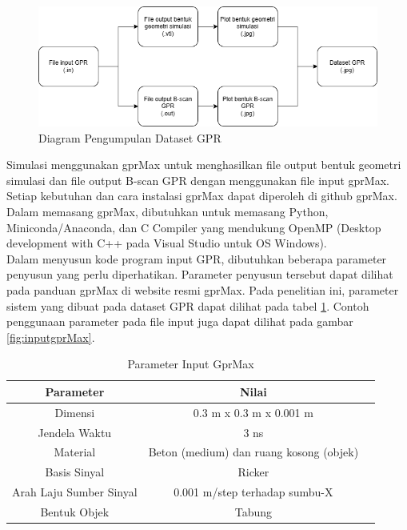 \documentclass[conference]{IEEEtran}
\begin{document}
\begin{figure}[ht]
  \centering
  \includegraphics[scale=0.35]{gambar/alur pengumpulan data.png}
  \caption{Diagram Pengumpulan Dataset GPR}
  \label{fig:datasetgpr}
\end{figure}

Simulasi menggunakan gprMax untuk menghasilkan file output bentuk geometri simulasi dan file output B-scan GPR dengan menggunakan file input gprMax. 
Setiap kebutuhan dan cara instalasi gprMax dapat diperoleh di github gprMax. 
Dalam memasang gprMax, dibutuhkan untuk memasang Python, Miniconda/Anaconda, dan C Compiler yang mendukung OpenMP (Desktop development with C++ pada Visual Studio untuk OS Windows). \\

Dalam menyusun kode program input GPR, dibutuhkan beberapa parameter penyusun yang perlu diperhatikan. 
Parameter penyusun tersebut dapat dilihat pada panduan gprMax di website resmi gprMax. 
Pada penelitian ini, parameter sistem yang dibuat pada dataset GPR dapat dilihat pada tabel \ref{tb:inputGPR}. 
Contoh penggunaan parameter pada file input juga dapat dilihat pada gambar \ref{fig:inputgprMax}.

\begin{table}[htbp]
    \caption{Parameter Input GprMax}
    \begin{center}
    \begin{tabular}{|c|c|c|}
    \hline
    \textbf{Parameter} & \textbf{Nilai} \\
    \hline
    Dimensi                     & 0.3 m x 0.3 m x 0.001 m                   \\
    Jendela Waktu               & 3 ns                                      \\
    Material                    & Beton (medium) dan ruang kosong (objek)   \\
    Basis Sinyal                & Ricker                                    \\
    Arah Laju Sumber Sinyal     & 0.001 m/step terhadap sumbu-X             \\
    Bentuk Objek                & Tabung                                    \\
    \hline
    \end{tabular}
    \label{tb:inputGPR}
    \end{center}
\end{table}
\end{document}

